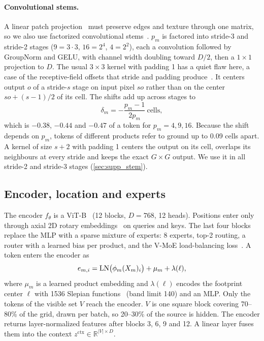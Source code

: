 \paragraph{Convolutional stems.} A linear patch projection~\cite{dosovitskiy2021image} must preserve edges and texture through one matrix, so we also use factorized convolutional stems~\cite{xiao2021early}. $p_m$ is factored into stride-3 and stride-2 stages ($9{=}3{\cdot}3$, $16{=}2^4$, $4{=}2^2$), each a convolution followed by GroupNorm and GELU, with channel width doubling toward $D/2$, then a $1\times1$ projection to $D$. The usual $3\times3$ kernel with padding 1 has a quiet flaw here, a case of the receptive-field offsets that stride and padding produce~\cite{araujo2019computing,alsallakh2021mind}. It centers output $o$ of a stride-$s$ stage on input pixel $so$ rather than on the center $so+(s{-}1)/2$ of its cell. The shifts add up across stages to
\begin{equation}
  \delta_m = -\frac{p_m-1}{2p_m}\ \text{cells},
  \label{eq:shift}
\end{equation}
which is $-0.38$, $-0.44$ and $-0.47$ of a token for $p_m = 4, 9, 16$. Because the shift depends on $p_m$, tokens of different products refer to ground up to 0.09 cells apart. A kernel of size $s{+}2$ with padding 1 centers the output on its cell, overlaps its neighbours at every stride and keeps the exact $G\times G$ output. We use it in all stride-2 and stride-3 stages (\cref{sec:supp_stem}).

\subsection{Encoder, location and experts}
\label{sec:encoder}

The encoder $f_\theta$ is a ViT-B~\cite{dosovitskiy2021image} (12 blocks, $D{=}768$, 12 heads). Positions enter only through axial 2D rotary embeddings~\cite{su2024roformer,heo2024rotary} on queries and keys. The last four blocks replace the MLP with a sparse mixture of experts: 8 experts, top-2 routing, a router with a learned bias per product, and the V-MoE load-balancing loss~\cite{riquelme2021scaling}. A token enters the encoder as
\begin{equation}
  e_{m,i} = \operatorname{LN}\!\big(\phi_m(X_m)_i\big) + \mu_m + \lambda(\ell),
\end{equation}
where $\mu_m$ is a learned product embedding and $\lambda(\ell)$ encodes the footprint center $\ell$ with 1536 Slepian functions~\cite{simons2006spatiospectral,rao2026localized} (band limit 140) and an MLP. Only the tokens of the visible set $V$ reach the encoder. $V$ is one square block covering 70--80\% of the grid, drawn per batch, so 20--30\% of the source is hidden. The encoder returns layer-normalized features after blocks 3, 6, 9 and 12. A linear layer fuses them into the context $z^{\text{ctx}} \in \mathbb{R}^{|V|\times D}$.

